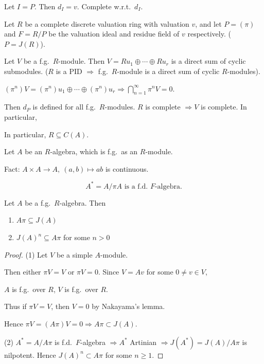 \documentclass[11pt, a4paper]{report}
\begin{document}
\begin{example}
Let $I=P$. Then $d_I=v$. Complete w.r.t.\ $d_I$.

Let $R$ be a complete discrete valuation ring with valuation $v$, and let $P=(\pi)$ and $F=R / P$ be the valuation ideal and residue field of $v$ respectively. ($P=J(R)$).

Let $V$ be a f.g.\ $R$-module. Then $V=R u_{1} \oplus \cdots \oplus R u_{r}$ is a direct sum of cyclic submodules. ($R$ is a PID $\Rightarrow$ f.g.\ $R$-module is a direct sum of cyclic $R$-modules).

$\left(\pi^{n}\right) V=\left(\pi^{n}\right) u_{1} \oplus \cdots \oplus\left(\pi^{n}\right) u_{r} \Rightarrow \bigcap_{n=1}^{\infty} \pi^{n} V=0$.

Then $d_P$ is defined for all f.g.\ $R$-modules. $R$ is complete $\Rightarrow V$ is complete. In particular,

In particular, $R \subseteq C(A)$.

Let $A$ be an $R$-algebra, which is f.g.\ as an $R$-module.

Fact: $A \times A \rightarrow A,\ (a, b) \mapsto a b$ is continuous.

\[
A^{*}=A / \pi A \text{ is a f.d.\ } F \text{-algebra.}
\]

\end{example}

\begin{theorem}
Let $A$ be a f.g.\ $R$-algebra. Then
\begin{enumerate}
\item $A\pi \subseteq J(A)$
\item $J(A)^{n} \subseteq A\pi$ for some $n>0$
\end{enumerate}
\end{theorem}

\begin{proof}
(1) Let $V$ be a simple $A$-module.

Then either $\pi V=V$ or $\pi V=0$. Since $V=A v$ for some $0 \neq v \in V$,

$A$ is f.g.\ over $R$, $V$ is f.g.\ over $R$.

Thus if $\pi V=V$, then $V=0$ by Nakayama's lemma.

Hence $\pi V=(A\pi) V=0 \Rightarrow A\pi \subset J(A)$.

(2) $A^{*}=A / A\pi$ is f.d.\ $F$-algebra $\Rightarrow A^{*}$ Artinian $\Rightarrow J\left(A^{*}\right)=J(A) / A\pi$ is nilpotent. Hence $J(A)^{n} \subset A\pi$ for some $n \geqslant 1$.

\end{proof}
\end{document}
